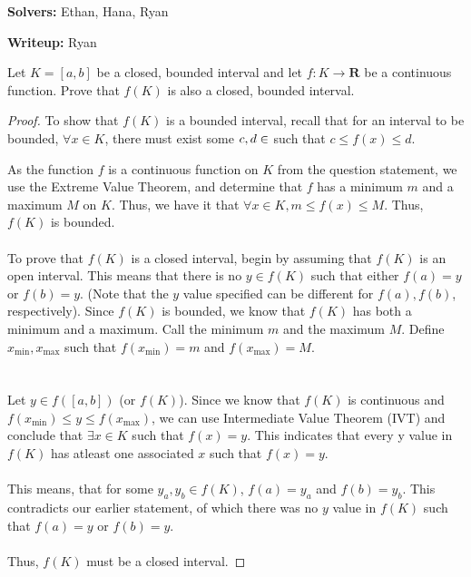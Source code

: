 \documentclass{article}
\newcommand{\R}{\mathbf{R}}
\theoremstyle{plain} %
\numberwithin{thm}{section} %
\theoremstyle{definition}
\begin{document}
    \textbf{Solvers:} Ethan, Hana, Ryan

    \textbf{Writeup:} Ryan

    Let \(K=[a,b]\) be a closed, bounded interval and let \(f:K\rightarrow \R\) be a continuous function. Prove that \(f(K)\) is also a closed, bounded interval.

    \begin{proof}
        To show that \(f(K)\) is a bounded interval, recall that for an interval to be bounded, \(\forall x\in K\), there must exist some \(c,d\in\real\) such that \(c\leq f(x)\leq d\).
        
        As the function \(f\) is a continuous function on \(K\) from the question statement, we use the Extreme Value Theorem, and determine that \(f\) has a minimum \(m\) and a maximum \(M\) on \(K\).
        Thus, we have it that \(\forall x \in K, m \leq f(x)\leq M\). Thus, \(f(K)\) is bounded.
        \\\\
        To prove that \(f(K)\) is a closed interval, begin by assuming that \(f(K)\) is an open interval.
        This means that there is no \(y\in f(K)\) such that either \(f(a) = y\) or \(f(b) = y\). (Note that the \(y\) value specified can be different for \(f(a),f(b)\), respectively).
        Since \(f(K)\) is bounded, we know that \(f(K)\) has both a minimum and a maximum. Call the minimum \(m\) and the maximum \(M\). Define \(x_\text{min}, x_\text{max}\) such that \(f(x_\text{min}) = m\) and \(f(x_\text{max}) = M\).\\
        \\\\
        Let \(y\in f(\left[a,b\right])\) (or \(f(K)\)). Since we know that \(f(K)\) is continuous and \(f(x_\text{min}) \leq y \leq f(x_\text{max})\), we can use Intermediate Value Theorem (IVT) and conclude that \(\exists x\in K\) such that \(f(x) = y\). This indicates that every y value in \(f(K)\) has atleast one associated \(x\) such that \(f(x) = y\).
        \\\\
        This means, that for some \(y_a, y_b \in f(K)\), \(f(a) = y_a\) and \(f(b) = y_b\). This contradicts our earlier statement, of which there was no \(y\) value in \(f(K)\) such that \(f(a) = y\) or \(f(b) = y\).
        \\\\
        Thus, \(f(K)\) must be a closed interval.
    \end{proof}
\end{document}
